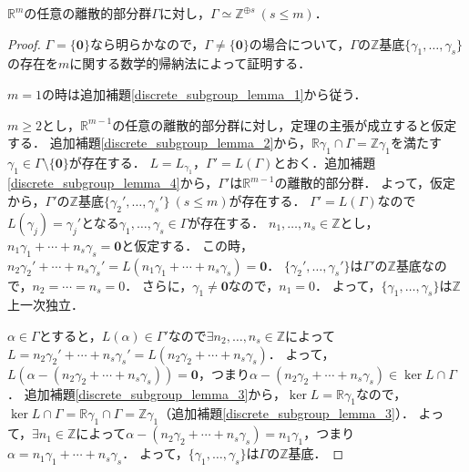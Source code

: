 \begin{screen}
  \begin{thm}
    \label{discrete_subgroup_theorem}
    $\mathbb{R}^m$の任意の離散的部分群$\Gamma$に対し，$\Gamma\simeq\mathbb{Z}^{\oplus s}\ (s\leq m)．$
  \end{thm}
\end{screen}
\begin{proof}
  $\Gamma=\{\boldsymbol{0}\}$なら明らかなので，$\Gamma\neq\{\boldsymbol{0}\}$の場合について，$\Gamma$の$\mathbb{Z}$基底$\{\gamma_1,\ldots,\gamma_s\}$の存在を$m$に関する数学的帰納法によって証明する．

  $m=1$の時は追加補題\ref{discrete_subgroup_lemma_1}から従う．

  $m\geq2$とし，$\mathbb{R}^{m-1}$の任意の離散的部分群に対し，定理の主張が成立すると仮定する．
  追加補題\ref{discrete_subgroup_lemma_2}から，$\mathbb{R}\gamma_1\cap\Gamma=\mathbb{Z}\gamma_1$を満たす$\gamma_1\in\Gamma\setminus\{\boldsymbol{0}\}$が存在する．
  $L=L_{\gamma_1}$，$\Gamma'=L(\Gamma)$とおく．追加補題\ref{discrete_subgroup_lemma_4}から，$\Gamma'$は$\mathbb{R}^{m-1}$の離散的部分群．
  よって，仮定から，$\Gamma'$の$\mathbb{Z}$基底$\{\gamma_2',\ldots,\gamma_s'\}~ (s\leq m)$が存在する．
  $\Gamma'=L(\Gamma)$なので$L(\gamma_j)=\gamma_j'$となる$\gamma_1,\ldots,\gamma_s\in\Gamma$が存在する．
  $n_1,\ldots,n_s\in\mathbb{Z}$とし，$n_1\gamma_1+\cdots+n_s\gamma_s=\boldsymbol{0}$と仮定する．
  この時，$n_2\gamma_2'+\cdots+n_s\gamma_s'=L(n_1\gamma_1+\cdots+n_s\gamma_s)=\boldsymbol{0}$．
  $\{\gamma_2',\ldots,\gamma_s'\}$は$\Gamma'$の$\mathbb{Z}$基底なので，$n_2=\cdots=n_s=0$．
  さらに，$\gamma_1\neq\boldsymbol{0}$なので，$n_1=0$．
  よって，$\{\gamma_1,\ldots,\gamma_s\}$は$\mathbb{Z}$上一次独立．

  $\alpha\in\Gamma$とすると，$L(\alpha)\in\Gamma'$なので$\exists n_2,\ldots,n_s\in\mathbb{Z}$によって$L=n_2\gamma_2'+\cdots+n_s\gamma_s'=L(n_2\gamma_2+\cdots+n_s\gamma_s)$．
  よって，$L(\alpha-(n_2\gamma_2+\cdots+n_s\gamma_s))=\boldsymbol{0}$，つまり$\alpha-(n_2\gamma_2+\cdots+n_s\gamma_s)\in\ker L\cap\Gamma$．
  追加補題\ref{discrete_subgroup_lemma_3}から，$\ker L=\mathbb{R}\gamma_1$なので，$\ker L\cap\Gamma=\mathbb{R}\gamma_1\cap\Gamma=\mathbb{Z}\gamma_1$（追加補題\ref{discrete_subgroup_lemma_3}）．
  よって，$\exists n_1\in\mathbb{Z}$によって$\alpha-(n_2\gamma_2+\cdots+n_s\gamma_s)=n_1\gamma_1$，つまり$\alpha=n_1\gamma_1+\cdots+n_s\gamma_s$．
  よって，$\{\gamma_1,\ldots,\gamma_s\}$は$\Gamma$の$\mathbb{Z}$基底．
\end{proof}

